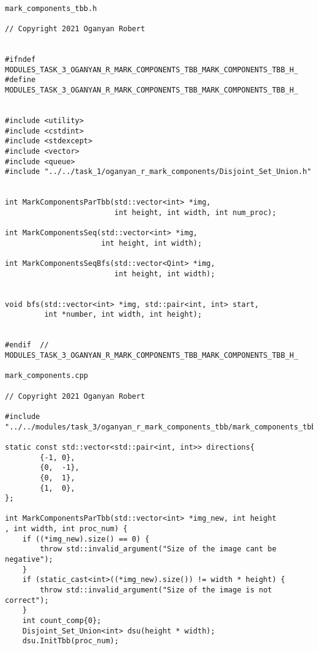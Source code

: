 \documentclass{report}
\begin{document}
\begin{lstlisting}

mark_components_tbb.h

// Copyright 2021 Oganyan Robert


#ifndef MODULES_TASK_3_OGANYAN_R_MARK_COMPONENTS_TBB_MARK_COMPONENTS_TBB_H_
#define MODULES_TASK_3_OGANYAN_R_MARK_COMPONENTS_TBB_MARK_COMPONENTS_TBB_H_


#include <utility>
#include <cstdint>
#include <stdexcept>
#include <vector>
#include <queue>
#include "../../task_1/oganyan_r_mark_components/Disjoint_Set_Union.h"


int MarkComponentsParTbb(std::vector<int> *img,
                         int height, int width, int num_proc);

int MarkComponentsSeq(std::vector<int> *img,
                      int height, int width);

int MarkComponentsSeqBfs(std::vector<Qint> *img,
                         int height, int width);


void bfs(std::vector<int> *img, std::pair<int, int> start,
         int *number, int width, int height);


#endif  //  MODULES_TASK_3_OGANYAN_R_MARK_COMPONENTS_TBB_MARK_COMPONENTS_TBB_H_

mark_components.cpp

// Copyright 2021 Oganyan Robert

#include "../../modules/task_3/oganyan_r_mark_components_tbb/mark_components_tbb.h"

static const std::vector<std::pair<int, int>> directions{
        {-1, 0},
        {0,  -1},
        {0,  1},
        {1,  0},
};

int MarkComponentsParTbb(std::vector<int> *img_new, int height
, int width, int proc_num) {
    if ((*img_new).size() == 0) {
        throw std::invalid_argument("Size of the image cant be negative");
    }
    if (static_cast<int>((*img_new).size()) != width * height) {
        throw std::invalid_argument("Size of the image is not correct");
    }
    int count_comp{0};
    Disjoint_Set_Union<int> dsu(height * width);
    dsu.InitTbb(proc_num);


\end{lstlisting}
\end{document}

